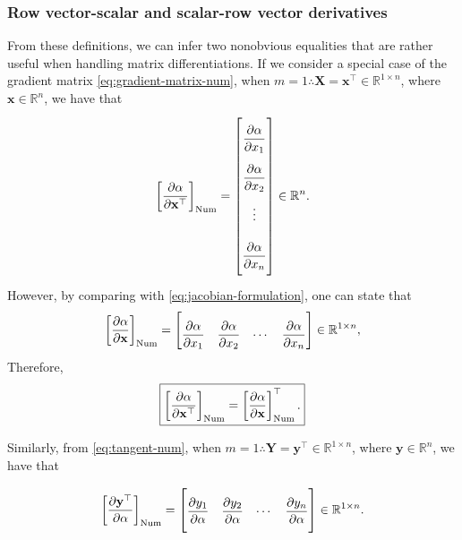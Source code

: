 \documentclass{article}
\begin{document}
\subsubsection{Row vector-scalar and scalar-row vector derivatives}

From these definitions, we can infer two nonobvious equalities that are rather useful when handling matrix differentiations. If we consider a special case of the gradient matrix \eqref{eq:gradient-matrix-num}, when $m=1 \therefore \mathbf{X} = \mathbf{x}^\top \in \mathbb{R}^{1\times n}$, where $\mathbf{x} \in \mathbb{R}^n$, we have that
\begin{align}
    \left[\dfrac{\partial \alpha}{\partial \mathbf{x}^\top}\right]_{\textnormal{Num}} = \renewcommand{\arraystretch}{2.6}\begin{bmatrix}
        \dfrac{\partial \alpha}{\partial x_{1}} \\
        \dfrac{\partial \alpha}{\partial x_{2}} \\
        \vdots \\
        \dfrac{\partial \alpha}{\partial x_{n}}\vspace{1.3ex}
    \end{bmatrix} \in \mathbb{R}^{n}.
\end{align}
However, by comparing with \eqref{eq:jacobian-formulation}, one can state that
\begin{align}
    \left[\dfrac{\partial \alpha}{\partial \mathbf{x}}\right]_{\textnormal{Num}} = \begin{bmatrix} \dfrac{\partial \alpha}{\partial x_{1}} & \dfrac{\partial \alpha}{\partial x_{2}} & \cdots & \dfrac{\partial \alpha}{\partial x_{n}} \end{bmatrix} \in \mathbb{R}^{1 \times n},
\end{align}
Therefore,
\begin{align}
    \label{eq:hidden-num}
    \boxed{\left[\dfrac{\partial \alpha}{\partial \mathbf{x}^\top}\right]_{\textnormal{Num}} = \left[\dfrac{\partial \alpha}{\partial \mathbf{x}}\right]_{\textnormal{Num}}^\top.}
\end{align}

Similarly, from \eqref{eq:tangent-num}, when $m=1 \therefore \mathbf{Y} = \mathbf{y}^\top \in \mathbb{R}^{1\times n}$, where $\mathbf{y} \in \mathbb{R}^n$, we have that

\begin{align}
    \left[\dfrac{\partial \mathbf{y}^\top}{\partial \alpha}\right]_{\textnormal{Num}} = \renewcommand{\arraystretch}{2.6}\begin{bmatrix}
        \dfrac{\partial y_{1}}{\partial \alpha} &
        \dfrac{\partial y_{2}}{\partial \alpha} &
        \cdots &
        \dfrac{\partial y_{n}}{\partial \alpha}\vspace{1.3ex}
    \end{bmatrix} \in \mathbb{R}^{1 \times n}.
\end{align}
\end{document}
